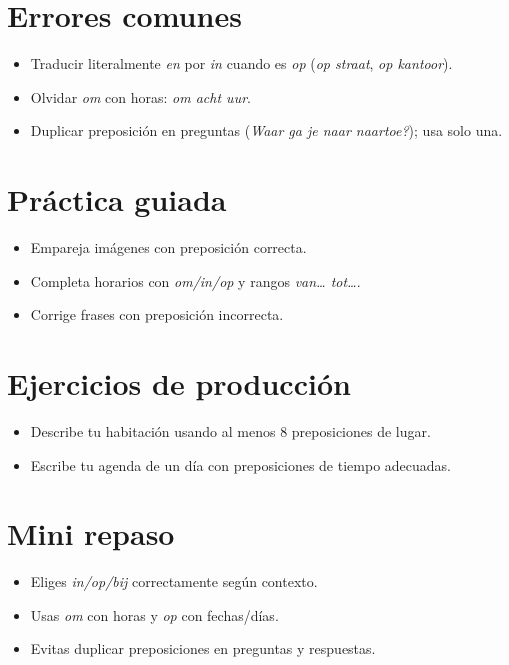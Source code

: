 \section{Errores comunes}
\begin{itemize}[leftmargin=*]
	\item Traducir literalmente \textit{en} por \textit{in} cuando es \textit{op} (\textit{op straat}, \textit{op kantoor}).
	\item Olvidar \textit{om} con horas: \textit{om acht uur}.
	\item Duplicar preposición en preguntas (\textit{Waar ga je naar naartoe?}); usa solo una.
\end{itemize}

\section{Práctica guiada}
\begin{itemize}[leftmargin=*]
	\item Empareja imágenes con preposición correcta.
	\item Completa horarios con \textit{om/in/op} y rangos \textit{van\ldots{} tot\ldots{}}.
	\item Corrige frases con preposición incorrecta.
\end{itemize}

\section{Ejercicios de producción}
\begin{itemize}[leftmargin=*]
	\item Describe tu habitación usando al menos 8 preposiciones de lugar.
	\item Escribe tu agenda de un día con preposiciones de tiempo adecuadas.
\end{itemize}

\section{Mini repaso}
\begin{itemize}[leftmargin=*]
	\item Eliges \textit{in/op/bij} correctamente según contexto.
	\item Usas \textit{om} con horas y \textit{op} con fechas/días.
	\item Evitas duplicar preposiciones en preguntas y respuestas.
\end{itemize}

